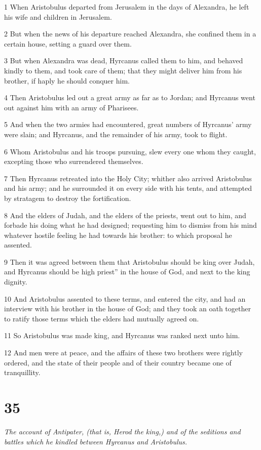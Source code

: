 1 When Aristobulus departed from Jerusalem in the days of Alexandra, he left his wife and children in Jerusalem. 

2 But when the news of his departure reached Alexandra, she confined them in a certain house, setting a guard over them. 

3 But when Alexandra was dead, Hyrcanus called them to him, and behaved kindly to them, and took care of them; that they might deliver him from his brother, if haply he should conquer him. 

4 Then Aristobulus led out a great army as far as to Jordan; and Hyrcanus went out against him with an army of Pharisees. 

5 And when the two armies had encountered, great numbers of Hyrcanus’ army were slain; and Hyrcanus, and the remainder of his army, took to flight. 

6 Whom Aristobulus and his troops pursuing, slew every one whom they caught, excepting those who surrendered themselves. 

7 Then Hyrcanus retreated into the Holy City; whither also arrived Aristobulus and his army; and he surrounded it on every side with his tents, and attempted by stratagem to destroy the fortification. 

8 And the elders of Judah, and the elders of the priests, went out to him, and forbade his doing what he had designed; requesting him to dismiss from his mind whatever hostile feeling he had towards his brother: to which proposal he assented. 

9 Then it was agreed between them that Aristobulus should be king over Judah, and Hyrcanus should be high priest” in the house of God, and next to the king dignity. 

10 And Aristobulus assented to these terms, and entered the city, and had an interview with his brother in the house of God; and they took an oath together to ratify those terms which the elders had mutually agreed on. 

11 So Aristobulus was made king, and Hyrcanus was ranked next unto him. 

12 And men were at peace, and the affairs of these two brothers were rightly ordered, and the state of their people and of their country became one of tranquillity. 

\chapter{35}

\par \textit{The account of Antipater, (that is, Herod the king,) and of the seditions and battles which he kindled between Hyrcanus and Aristobulus.}

